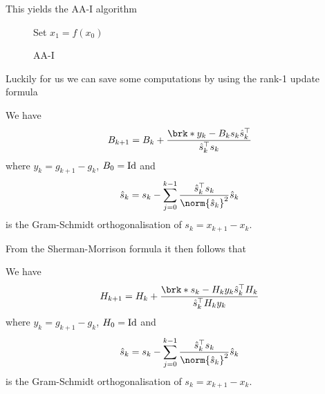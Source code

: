 \begin{frame}
	This yields the AA-I algorithm
	\begin{figure}
	\begin{algorithm}[H]
	\caption{AA-I}
	\color{gray}
	\BlankLine
	Set $x_1=f(x_0)$
	
	\end{algorithm}
	\end{figure}
\end{frame}

\begin{frame}
	Luckily for us we can save some computations by using the rank-1 update formula
	\begin{proposition}
		We have
		\begin{align*}
			B_{k+1} = B_k+\frac{\brk*{y_k-B_ks_k}\hs_k^\top}{\hs_k^\top s_k}
		\end{align*}
		where $y_k = g_{k+1}-g_k$, $B_0=\operatorname{Id}$ and
		\begin{align*}
			\hs_k = s_k-\sum_{j=0}^{k-1}\frac{\hs_k^\top s_k}{\norm{\hs_k}^2}\hs_k
		\end{align*}
		is the Gram-Schmidt orthogonalisation of $s_k=x_{k+1}-x_k$.
	\end{proposition}
\end{frame}

\begin{frame}
	From the Sherman-Morrison formula it then follows that
	\begin{proposition}
		We have
		\begin{align*}
			H_{k+1} = H_k+\frac{\brk*{s_k-H_ky_k}\hs_k^\top H_k}{\hs_k^\top H_ky_k}
		\end{align*}
		where $y_k = g_{k+1}-g_k$, $H_0=\operatorname{Id}$ and
		\begin{align*}
			\hs_k = s_k-\sum_{j=0}^{k-1}\frac{\hs_k^\top s_k}{\norm{\hs_k}^2}\hs_k
		\end{align*}
		is the Gram-Schmidt orthogonalisation of $s_k=x_{k+1}-x_k$.
	\end{proposition}
\end{frame}

